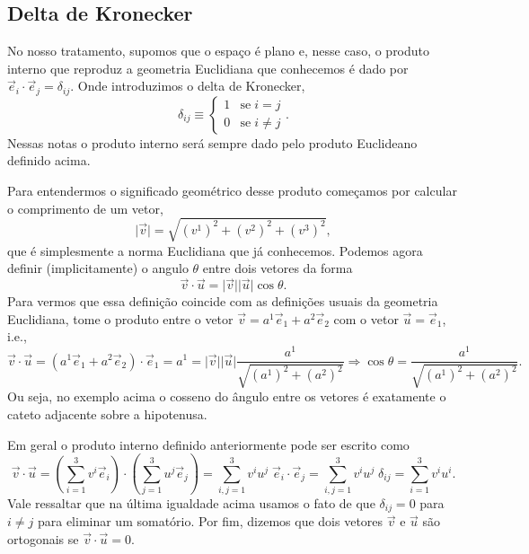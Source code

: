 \subsection{Delta de Kronecker}

No nosso tratamento, supomos que o espaço é plano e, nesse caso, o produto interno
que reproduz a geometria Euclidiana que conhecemos é dado por
$\vec{e}_i\cdot\vec{e}_j = \delta_{ij}$. Onde introduzimos o delta de Kronecker,
\begin{equation}
	\delta_{ij} \equiv \left\{ \begin{array}{cc}
		1 & \text{se}\; i=j     \\
		0 & \text{se}\; i\neq j\end{array} \right..
\end{equation}
Nessas notas o produto interno será sempre dado pelo produto Euclideano definido
acima.

Para entendermos o significado geométrico desse produto começamos por calcular o
comprimento de um vetor,
\begin{equation}
	\vert\vec{v}\vert = \sqrt{(v^1)^2+(v^2)^2+(v^3)^2},
\end{equation}
que é simplesmente a norma Euclidiana que já conhecemos. Podemos agora definir
(implicitamente) o angulo $\theta$ entre dois vetores da forma
\begin{equation}
	\vec{v}\cdot\vec{u} = \vert\vec{v}\vert\vert\vec{u}\vert \cos\theta.
\end{equation}
Para vermos que essa definição coincide com as definições usuais da geometria
Euclidiana, tome o produto entre o vetor $\vec{v} = a^1\vec{e}_1+a^2\vec{e}_2$
com o vetor $\vec{u} = \vec{e}_1$, i.e.,
\begin{equation}
	\vec{v}\cdot\vec{u} = \left(a^1\vec{e}_1+a^2\vec{e}_2\right)\cdot \vec{e}_1 = a^1 = \vert\vec{v}\vert\vert\vec{u}\vert \frac{a^1}{\sqrt{(a^1)^2+(a^2)^2}} \Rightarrow \cos\theta = \frac{a^1}{\sqrt{(a^1)^2+(a^2)^2}}.
\end{equation}
Ou seja, no exemplo acima o cosseno do ângulo entre os vetores é exatamente o
cateto adjacente sobre a hipotenusa.

Em geral o produto interno definido anteriormente pode ser escrito como
\begin{equation}\label{prodint}
	\vec{v}\cdot\vec{u} = \left(\sum_{i=1}^3v^i\vec{e}_i\right)\cdot \left(\sum_{j=1}^3u^j\vec{e}_j\right) = \sum_{i,j=1}^3v^iu^j \;\vec{e}_i\cdot\vec{e}_j = \sum_{i,j=1}^3v^iu^j \; \delta_{ij} = \sum_{i=1}^3v^iu^i.
\end{equation}
Vale ressaltar que na última igualdade acima usamos o fato de que $\delta_{ij} =
	0$ para $i \neq j$ para eliminar um somatório. Por fim, dizemos que dois vetores
$\vec{v}$ e $\vec{u}$ são ortogonais se $\vec{v}\cdot\vec{u} = 0$.

